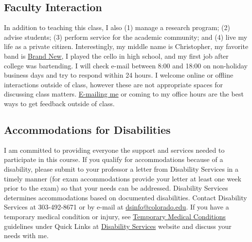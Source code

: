 \documentclass[10pt]{memoir}
\begin{document}

\subsection{Faculty Interaction}
In addition to teaching this class, I also (1) manage a research program; (2) advise students; (3) perform service for the academic community; and (4) live my life as a private citizen. Interestingly, my middle name is Christopher, my favorite band is \href{http://www.fightoffyourdemons.com/}{Brand New}, I played the cello in high school, and my first job after college was bartending. I will check e-mail between 8:00 and 18:00 on non-holiday business days and try to respond within 24 hours. I welcome online or offline interactions outside of class, however these are not appropriate spaces for discussing class matters. \href{maito:brian.keegan@colorado.edu}{E-mailing me} or coming to my office hours are the best ways to get feedback outside of class.


\subsection{Accommodations for Disabilities}
I am committed to providing everyone the support and services needed to participate in this course. If you qualify for accommodations because of a disability, please submit to your professor a letter from Disability Services in a timely manner (for exam accommodations provide your letter at least one week prior to the exam) so that your needs can be addressed. Disability Services determines accommodations based on documented disabilities. Contact Disability Services at 303-492-8671 or by e-mail at \href{mailto:dsinfo@colorado.edu}{dsinfo@colorado.edu}. If you have a temporary medical condition or injury, see \href{http://www.colorado.edu/disabilityservices/students/temporary-medical-conditions}{Temporary Medical Conditions} guidelines under Quick Links at \href{http://www.colorado.edu/disabilityservices/students}{Disability Services} website and discuss your needs with me.
\end{document}
